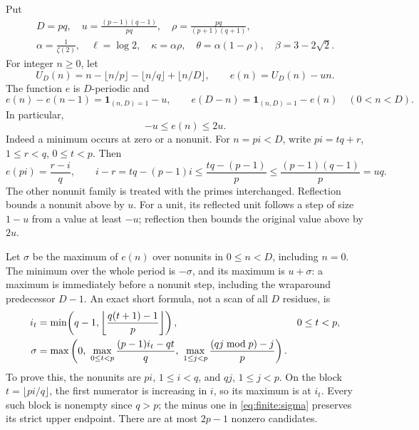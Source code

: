 \documentclass[11pt]{article}
\theoremstyle{definition}\newtheorem{definition}[theorem]{Definition}
\theoremstyle{remark}\newtheorem{remark}[theorem]{Remark}
\begin{document}
Put
\[
 \begin{gathered}
 D=pq,\quad u=\frac{(p-1)(q-1)}{pq},\quad
 \rho=\frac{pq}{(p+1)(q+1)},\\
 \alpha=\frac1{\zeta(2)},\quad \ell=\log2,\quad
 \kappa=\alpha\rho,\quad \theta=\alpha(1-\rho),\quad
 \beta=3-2\sqrt2 .
 \end{gathered}
\]
For integer \(n\ge0\), let
\[
 U_D(n)=n-\lfloor n/p\rfloor-\lfloor n/q\rfloor+\lfloor n/D\rfloor,
 \qquad e(n)=U_D(n)-un .
\]
The function \(e\) is \(D\)-periodic and
\[
 e(n)-e(n-1)=\mathbf1_{(n,D)=1}-u,\qquad
 e(D-n)=\mathbf1_{(n,D)=1}-e(n)\quad(0<n<D).
\]
In particular,
\begin{equation}
 -u\le e(n)\le2u. \label{eq:finite:discrepancy}
\end{equation}
Indeed a minimum occurs at zero or a nonunit.  For \(n=pi<D\),
write \(pi=tq+r\), \(1\le r<q\), \(0\le t<p\).  Then
\[
 e(pi)=\frac{r-i}{q},\qquad
 i-r=tq-(p-1)i\le\frac{tq-(p-1)}p
                  \le\frac{(p-1)(q-1)}p=uq .
\]
The other nonunit family is treated with the primes interchanged.
Reflection bounds a nonunit above by \(u\).  For a unit, its reflected
unit follows a step of size \(1-u\) from a value at least \(-u\);
reflection then bounds the original value above by \(2u\).

Let \(\sigma\) be the maximum of \(e(n)\) over nonunits in \(0\le n<D\),
including \(n=0\).  The minimum over the whole period is \(-\sigma\),
and its maximum is \(u+\sigma\): a maximum is immediately before a
nonunit step, including the wraparound predecessor \(D-1\).
An exact short formula, not a scan of all \(D\) residues, is
\begin{align}
 i_t&=\min\!\left(q-1,\left\lfloor\frac{q(t+1)-1}{p}\right\rfloor\right),
       &&0\le t<p, \notag\\
 \sigma&=\max\left(
 0,\ \max_{0\le t<p}\frac{(p-1)i_t-qt}{q},\
       \max_{1\le j<p}\frac{(qj\bmod p)-j}{p}\right).
 \label{eq:finite:sigma}
\end{align}
To prove this, the nonunits are \(pi\), \(1\le i<q\), and \(qj\),
\(1\le j<p\).  On the block \(t=\lfloor pi/q\rfloor\),
the first numerator is increasing in \(i\), so its maximum is at \(i_t\).
Every such block is nonempty since \(q>p\); the minus one in
\eqref{eq:finite:sigma} preserves its strict upper endpoint.
There are at most \(2p-1\) nonzero candidates.
\end{document}
